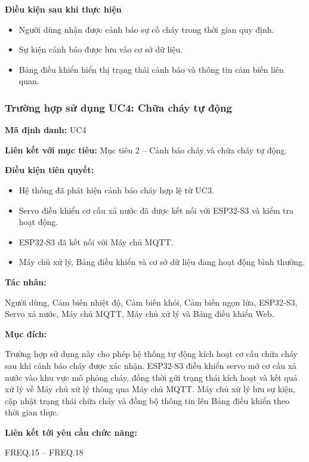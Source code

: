 \documentclass[a4paper,12pt]{article}
\begin{document}
\textbf{Điều kiện sau khi thực hiện}

\begin{itemize}
    \item Người dùng nhận được cảnh báo sự cố cháy trong thời gian quy định.
    \item Sự kiện cảnh báo được lưu vào cơ sở dữ liệu.
    \item Bảng điều khiển hiển thị trạng thái cảnh báo và thông tin cảm biến liên quan.
\end{itemize}

\subsubsection{Trường hợp sử dụng UC4: Chữa cháy tự động}

\textbf{Mã định danh:} UC4

\textbf{Liên kết với mục tiêu:} Mục tiêu 2 -- Cảnh báo cháy và chữa cháy tự động.

\textbf{Điều kiện tiên quyết:}
\begin{itemize}
    \item Hệ thống đã phát hiện cảnh báo cháy hợp lệ từ UC3.
    \item Servo điều khiển cơ cấu xả nước đã được kết nối với ESP32-S3 và kiểm tra hoạt động.
    \item ESP32-S3 đã kết nối với Máy chủ MQTT.
    \item Máy chủ xử lý, Bảng điều khiển và cơ sở dữ liệu đang hoạt động bình thường.
\end{itemize}

\textbf{Tác nhân:}

Người dùng, Cảm biến nhiệt độ, Cảm biến khói, Cảm biến ngọn lửa, ESP32-S3, Servo xả nước, Máy chủ MQTT, Máy chủ xử lý và Bảng điều khiển Web.

\textbf{Mục đích:}

Trường hợp sử dụng này cho phép hệ thống tự động kích hoạt cơ cấu chữa cháy sau khi cảnh báo cháy được xác nhận. ESP32-S3 điều khiển servo mở cơ cấu xả nước vào khu vực mô phỏng cháy, đồng thời gửi trạng thái kích hoạt và kết quả xử lý về Máy chủ xử lý thông qua Máy chủ MQTT. Máy chủ xử lý lưu sự kiện, cập nhật trạng thái chữa cháy và đồng bộ thông tin lên Bảng điều khiển theo thời gian thực.

\textbf{Liên kết tới yêu cầu chức năng:}

FREQ.15 -- FREQ.18
\end{document}

